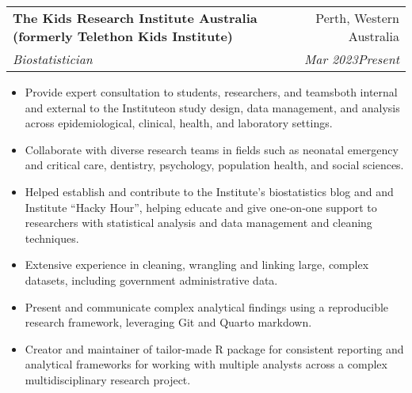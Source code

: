 \documentclass[letterpaper,10.8pt]{article}
\makeatletter
\newcommand{\resumeItem}[2]{
  \item\small{
    \textbf{#1}{#2 \vspace{-2pt}}
  }
}
\newcommand{\resumeSubheading}[4]{
  \vspace{-1pt}\item
    \begin{tabular*}{0.97\textwidth}{l@{\extracolsep{\fill}}r}
      \textbf{#1} & #2 \\
      \textit{\small#3} & \textit{\small #4} \\
    \end{tabular*}\vspace{-5pt}
}
\newcommand{\resumeItemListStart}{\begin{itemize}}
\newcommand{\resumeItemListEnd}{\end{itemize}\vspace{-5pt}}
\makeatother
\begin{document}
    \resumeSubheading
    {The Kids Research Institute Australia (formerly Telethon Kids Institute)}{Perth, Western Australia}
    {Biostatistician}{Mar 2023\textendash Present}
    \resumeItemListStart
        \resumeItem{}{Provide expert consultation to students, researchers, and teams\textemdash both internal and external to the Institute\textemdash on study design, data management, and analysis across epidemiological, clinical, health, and laboratory settings.}
        \resumeItem{}{Collaborate with diverse research teams in fields such as neonatal emergency and critical care, dentistry, psychology, population health, and social sciences.}
        \resumeItem{}{Helped establish and contribute to the Institute's biostatistics blog and and Institute ``Hacky Hour'', helping educate and give one-on-one support to researchers with statistical analysis and data management and cleaning techniques.}
        \resumeItem{}{Extensive experience in cleaning, wrangling and linking large, complex datasets, including government administrative data.}
        \resumeItem{}{Present and communicate complex analytical findings using a reproducible research framework, leveraging Git and Quarto markdown.}
        \resumeItem{}{Creator and maintainer of tailor-made R package for consistent reporting and analytical frameworks for working with multiple analysts across a complex multidisciplinary research project.}
    \resumeItemListEnd
    
\end{document}
